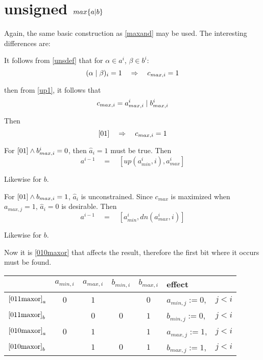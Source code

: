 \documentclass{article}
\begin{document}
\section{unsigned $max\{a\text{\textbar} b\}$}
Again, the same basic construction as \ref{maxand} may be used. 
The interesting differences are:

It follows from \eqref{unsdef} that for $\alpha \in a^i$, $\beta \in b^i$:
\begin{equation}
(\alpha \; \text{\textbar} \; \beta)_i = 1
\quad \Rightarrow \quad c_{max,i} = 1
\end{equation}

then from \eqref{up1}, it follows that 
\begin{equation}\label{maxoreq}
c_{max,i} = a^i_{max,i} \; \text{\textbar}\; b^i_{max,i}
\end{equation}

Then
\begin{equation*}
\eqref{01} \quad \Rightarrow \quad c_{max,i} = 1
\end{equation*}

For $\eqref{01} \wedge b^i_{max,i} = 0$, then $ \hat a_i = 1$ must be true. 
Then 
\begin{equation}\label{011maxor} 
a^{i-1} \quad = \quad [up(a^i_{min}, i), a^i_{max}]
\end{equation}

Likewise for $b$.
\vspace{10pt}

For $\eqref{01} \wedge b_{max,i} = 1$, $\hat a_i$ is unconstrained.
Since $c_{max}$ is maximized when $a_{max,j} = 1$, 
$\hat a_i = 0$ is desirable. Then
\begin{equation}\label{010maxor} 
a^{i-1} \quad = \quad [a^i_{min}, dn(a^i_{max},i)]
\end{equation}

Likewise for $b$.
\vspace{10pt}

Now it is \eqref{010maxor} that affects the result, therefore the first
bit where it occurs must be found.
\vspace{10pt}

\begin{tabular}{l|c|c|c|c|l r}
& $a_{min,i}$ & $a_{max,i}$ & $b_{min,i}$ & $b_{max,i}$ & effect &\\
\hline
$\eqref{011maxor}_a$ & $0$ & $1$ & & $0$ & $a_{min,j} := 0$, \;& $j < i$ \\
\hline
$\eqref{011maxor}_b$ & & $0$ & $0$ & $1$ & $b_{min,j} := 0$, \;& $j < i$ \\
\hline
$\eqref{010maxor}_a$ & $0$ & $1$ & & $1$ & $a_{max,j} := 1$, \;& $j < i$ \\
\hline
$\eqref{010maxor}_b$ & & $1$ & $0$ & $1$ & $b_{max,j} := 1$, \;& $j < i$ \\
\end{tabular}
\vspace{10pt}
\end{document}
